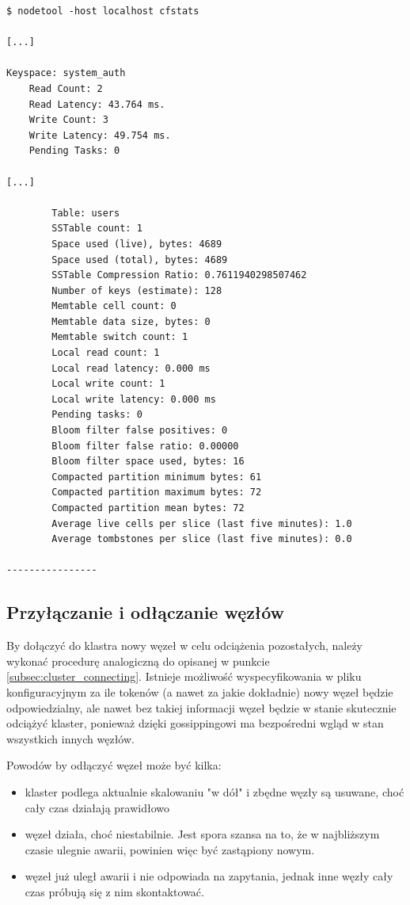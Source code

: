 \documentclass{article} %
\begin{document}
\begin{lstlisting}[style=bash, caption={statystyki dla przestrzeni kluczy \texttt{system\_auth}}]
$ nodetool -host localhost cfstats

[...]

Keyspace: system_auth
	Read Count: 2
	Read Latency: 43.764 ms.
	Write Count: 3
	Write Latency: 49.754 ms.
	Pending Tasks: 0

[...]

		Table: users
		SSTable count: 1
		Space used (live), bytes: 4689
		Space used (total), bytes: 4689
		SSTable Compression Ratio: 0.7611940298507462
		Number of keys (estimate): 128
		Memtable cell count: 0
		Memtable data size, bytes: 0
		Memtable switch count: 1
		Local read count: 1
		Local read latency: 0.000 ms
		Local write count: 1
		Local write latency: 0.000 ms
		Pending tasks: 0
		Bloom filter false positives: 0
		Bloom filter false ratio: 0.00000
		Bloom filter space used, bytes: 16
		Compacted partition minimum bytes: 61
		Compacted partition maximum bytes: 72
		Compacted partition mean bytes: 72
		Average live cells per slice (last five minutes): 1.0
		Average tombstones per slice (last five minutes): 0.0

----------------
\end{lstlisting}

\subsection{Przyłączanie i odłączanie węzłów}\label{sec:management_nodepool}

By dołączyć do klastra nowy węzeł w celu odciążenia pozostałych, należy wykonać procedurę analogiczną do opisanej w punkcie \ref{subsec:cluster_connecting}.
Istnieje możliwość wyspecyfikowania w pliku konfiguracyjnym za ile tokenów (a nawet za jakie dokładnie) nowy węzeł będzie odpowiedzialny, ale nawet bez takiej informacji węzeł będzie w stanie skutecznie odciążyć klaster, ponieważ dzięki gossippingowi ma bezpośredni wgląd w stan wszystkich innych węzłów.

Powodów by odłączyć węzeł może być kilka:
\begin{itemize}
\item klaster podlega aktualnie skalowaniu "w dół" i zbędne węzły są usuwane, choć cały czas działają prawidłowo
\item węzeł działa, choć niestabilnie. Jest spora szansa na to, że w najbliższym czasie ulegnie awarii, powinien więc być zastąpiony nowym.
\item węzeł już uległ awarii i nie odpowiada na zapytania, jednak inne węzły cały czas próbują się z nim skontaktować.
\end{itemize}
\end{document}
